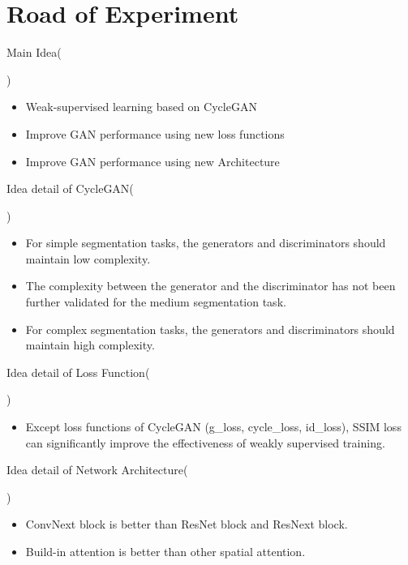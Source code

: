\section{Road of Experiment}

\begin{tcolorbox}[colback=yellow!5!white, colframe=yellow!25!black, colbacktitle=red!50!white, coltitle=black, title={\large \textbf{Idea}}]
	Main Idea\hspace{\fill}(\date{May 11, 2022})
	\tcblower
	\begin{itemize}
	\item Weak-supervised learning based on CycleGAN
	\item Improve GAN performance using new loss functions
	\item Improve GAN performance using new Architecture
	\end{itemize}
\end{tcolorbox}

\begin{tcolorbox}[colback=yellow!5!white, colframe=yellow!25!black, colbacktitle=yellow!50!white, coltitle=black, title={\large \textbf{Idea Detail}}]
	Idea detail of CycleGAN\hspace{\fill}(\date{May 11, 2022})
	\begin{itemize}
		\item For simple segmentation tasks, the generators and discriminators should maintain low complexity.
		\item The complexity between the generator and the discriminator has not been further validated for the medium segmentation task.
		\item For complex segmentation tasks, the generators and discriminators should maintain high complexity.
	\end{itemize}
	\tcbline

	Idea detail of Loss Function\hspace{\fill}(\date{May 11, 2022})
	\begin{itemize}
		\item Except loss functions of CycleGAN (g\_loss, cycle\_loss, id\_loss), SSIM loss can significantly improve the effectiveness of weakly supervised training.
	\end{itemize}
	\tcbline

	Idea detail of Network Architecture\hspace{\fill}(\date{May 11, 2022})
	\begin{itemize}
		\item ConvNext block is better than ResNet block and ResNext block.
		\item Build-in attention is better than other spatial attention.
	\end{itemize}
\end{tcolorbox}

